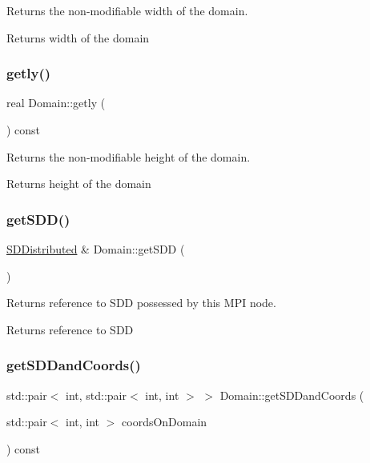 Returns the non-\/modifiable width of the domain. 

\begin{DoxyReturn}{Returns}
width of the domain 
\end{DoxyReturn}
\mbox{\label{classDomain_ac9cedab179bb0611fc0e9fcfbcedb835}} 
\subsubsection{\texorpdfstring{getly()}{getly()}}
{\footnotesize\ttfamily real Domain\+::getly (\begin{DoxyParamCaption}{ }\end{DoxyParamCaption}) const\hspace{0.3cm}{\ttfamily [inline]}}



Returns the non-\/modifiable height of the domain. 

\begin{DoxyReturn}{Returns}
height of the domain 
\end{DoxyReturn}
\mbox{\label{classDomain_a26ceb37145bc70b3cc85e15e24a54287}} 
\subsubsection{\texorpdfstring{get\+S\+D\+D()}{getSDD()}}
{\footnotesize\ttfamily \mbox{\hyperlink{classSDDistributed}{S\+D\+Distributed}} \& Domain\+::get\+S\+DD (\begin{DoxyParamCaption}{ }\end{DoxyParamCaption})}



Returns reference to S\+DD possessed by this M\+PI node. 

\begin{DoxyReturn}{Returns}
reference to S\+DD 
\end{DoxyReturn}
\mbox{\label{classDomain_a5b3fd7cbe29576ea63219b326c15680e}} 
\subsubsection{\texorpdfstring{get\+S\+D\+Dand\+Coords()}{getSDDandCoords()}}
{\footnotesize\ttfamily std\+::pair$<$ int, std\+::pair$<$ int, int $>$ $>$ Domain\+::get\+S\+D\+Dand\+Coords (\begin{DoxyParamCaption}\item[{std\+::pair$<$ int, int $>$}]{coords\+On\+Domain }\end{DoxyParamCaption}) const}




